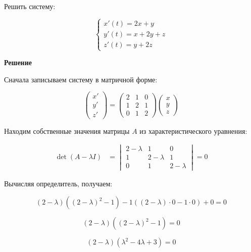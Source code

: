 Решить систему:

\begin{equation*}
    \begin{cases}
        x'(t) = 2x + y \\
        y'(t) = x + 2y + z \\
        z'(t) = y + 2z
    \end{cases}
\end{equation*}

\textbf{Решение}

Сначала записываем систему в матричной форме:

\begin{equation*}
    \begin{pmatrix} x' \\ y' \\ z' \end{pmatrix} =
    \begin{pmatrix}
        2 & 1 & 0 \\
        1 & 2 & 1 \\
        0 & 1 & 2
    \end{pmatrix}
    \begin{pmatrix} x \\ y \\ z \end{pmatrix}
\end{equation*}

Находим собственные значения матрицы \(A\) из характеристического уравнения:

\begin{align*}
    \det(A - \lambda I) &=
    \begin{vmatrix}
        2-\lambda & 1 & 0 \\
        1 & 2-\lambda & 1 \\
        0 & 1 & 2-\lambda
    \end{vmatrix} = 0
\end{align*}

Вычисляя определитель, получаем:

\begin{equation*}
(2-\lambda)((2-\lambda)^2 - 1) - 1((2-\lambda)\cdot 0 - 1\cdot 0) + 0 = 0
\end{equation*}

\begin{equation*}
(2-\lambda)((2-\lambda)^2 - 1) = 0
\end{equation*}

\begin{equation*}
(2-\lambda)(\lambda^2 - 4\lambda + 3) = 0
\end{equation*}

